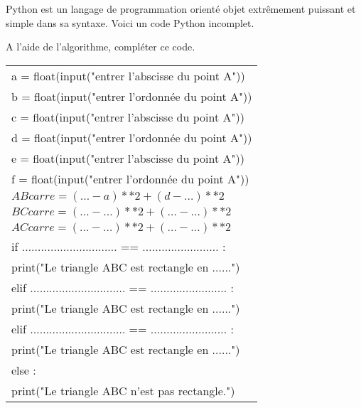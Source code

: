 \hfill
\begin{minipage}{0.48\linewidth}
Python est un langage de programmation orienté objet extrêmement puissant et simple dans sa syntaxe. Voici un code Python incomplet.

A l'aide de l'algorithme, compléter ce code.


\begin{tabular}{l}
\hline 
a = float(input("entrer l'abscisse du point A"))\\
b = float(input("entrer l'ordonnée du point A"))\\
c = float(input("entrer l'abscisse du point A"))\\
d = float(input("entrer l'ordonnée du point A"))\\
e = float(input("entrer l'abscisse du point A"))\\
f = float(input("entrer l'ordonnée du point A")) \\

$ABcarre = ( \ldots - a )**2 + ( d - \ldots )**2$\\
$BCcarre = ( \ldots - \ldots )**2 + ( \ldots - \ldots )**2$\\
$ACcarre = ( \ldots - \ldots )**2 + ( \ldots - \ldots )**2$\\


if $  \ldots \ldots \ldots \ldots \ldots\ldots \ldots \ldots \ldots \ldots $ == $ \ldots \ldots \ldots \ldots \ldots\ldots \ldots \ldots $ :\\
\hspace{1cm} print("Le triangle ABC est rectangle en ......")\\
elif $  \ldots \ldots \ldots \ldots \ldots\ldots \ldots \ldots \ldots \ldots $ == $ \ldots \ldots \ldots \ldots \ldots\ldots \ldots \ldots $ :\\
\hspace{1cm} print("Le triangle ABC est rectangle en ......")\\
elif $  \ldots \ldots \ldots \ldots \ldots\ldots \ldots \ldots \ldots \ldots $ == $ \ldots \ldots \ldots \ldots \ldots\ldots \ldots \ldots $ :\\
\hspace{1cm} print("Le triangle ABC est rectangle en ......")\\
else :\\
\hspace{1cm} print("Le triangle ABC n'est pas rectangle.")\\
\hline 
\end{tabular} 

\end{minipage}

